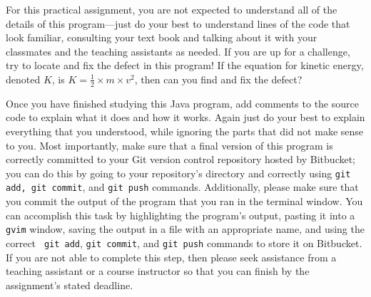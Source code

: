 For this practical assignment, you are not expected to understand all of the details of this program---just do your best
to understand lines of the code that look familiar, consulting your text book and talking about it with your classmates
and the teaching assistants as needed. If you are up for a challenge, try to locate and fix the defect in this program!
If the equation for kinetic energy, denoted $K$, is $K=\frac{1}{2} \times m \times v^2$, then can you find and fix the
defect?

Once you have finished studying this Java program, add comments to the source code to explain what it does and how it
works.  Again just do your best to explain everything that you understood, while ignoring the parts that did not make
sense to you.  Most importantly, make sure that a final version of this program is correctly committed to your Git
version control repository hosted by Bitbucket; you can do this by going to your repository's directory and correctly
using {\tt git add, git commit}, and {\tt git push} commands. Additionally, please make sure that you commit the output
of the program that you ran in the terminal window.  You can accomplish this task by highlighting the program's output,
pasting it into a {\tt gvim} window, saving the output in a file with an appropriate name, and using the correct {\tt
git add}, {\tt git commit}, and {\tt git push} commands to store it on Bitbucket.  If you are not able to complete this
step, then please seek assistance from a teaching assistant or a course instructor so that you can finish by the
assignment's stated deadline.



